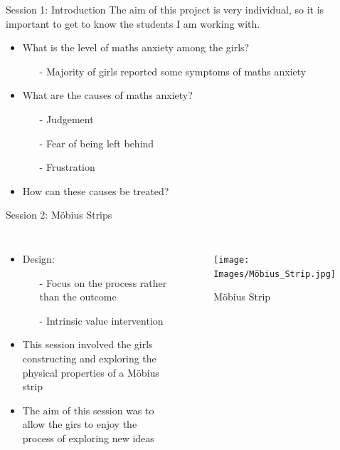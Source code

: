 \documentclass{beamer}  %
\begin{document}

\begin{frame}{Session 1: Introduction}
    The aim of this project is very individual, so it is important to get to know the students I am working with.
    \begin{itemize}
        \item What is the level of maths anxiety among the girls?
        \begin{itemize}
            \item[-]Majority of girls reported some symptoms of maths anxiety
        \end{itemize}
        \item What are the causes  of maths anxiety?
        \begin{itemize}
            \item[-] Judgement
            \item[-] Fear of being left behind
            \item[-] Frustration
        \end{itemize}
        \item How can these causes be treated?
    \end{itemize}
\end{frame}

\begin{frame}{Session 2: M\"{o}bius Strips}

    \begin{columns}
        \begin{itemize}
            \item Design:
            \begin{itemize}
                \item[-] Focus on the process rather than the outcome
                \item[-] Intrinsic value intervention
            \end{itemize} 
            \item This session involved the girls constructing and exploring the physical properties of a M\"{o}bius strip
            \item The aim of this session was to allow the girs to enjoy the process of exploring new ideas 
            
        \end{itemize}
        \begin{figure}
            \texttt{[image: Images/Möbius\_Strip.jpg]}
            \caption{M\"{o}bius Strip}
        \end{figure}
    \end{columns}
\end{frame}
\end{document}
